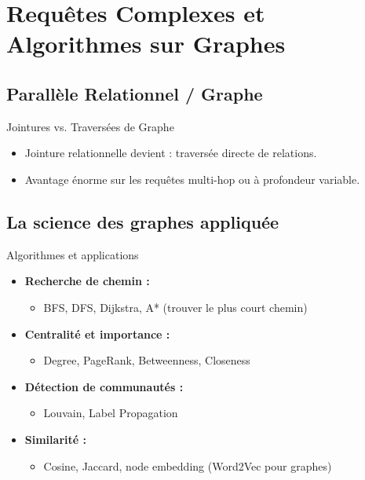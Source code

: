 \documentclass{beamer}
\begin{document}
\section{Requêtes Complexes et Algorithmes sur Graphes}
\subsection{Parallèle Relationnel / Graphe}
\begin{frame}{Jointures vs. Traversées de Graphe}
  \begin{itemize}
    \item Jointure relationnelle devient : traversée directe de relations.
    \item Avantage énorme sur les requêtes multi-hop ou à profondeur variable.
  \end{itemize}
\end{frame}

\subsection{La science des graphes appliquée}
\begin{frame}{Algorithmes et applications}
  \begin{itemize}
    \item \textbf{Recherche de chemin :}
      \begin{itemize}
        \item BFS, DFS, Dijkstra, A* (trouver le plus court chemin)
      \end{itemize}
    \item \textbf{Centralité et importance :}
      \begin{itemize}
        \item Degree, PageRank, Betweenness, Closeness
      \end{itemize}
    \item \textbf{Détection de communautés :}
      \begin{itemize}
        \item Louvain, Label Propagation 
      \end{itemize}
    \item \textbf{Similarité :}
      \begin{itemize}
        \item Cosine, Jaccard, node embedding (Word2Vec pour graphes)
      \end{itemize}
  \end{itemize}
\end{frame}
\end{document}
